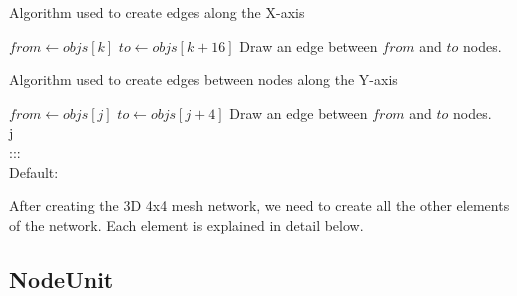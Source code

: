 \vspace{15mm}
\begin{algorithm}[H]
\small %
\caption{Algorithm used to create edges along the X-axis}
\label{alg2}
\begin{boxedminipage}{150mm}
\vspace{5mm}
\begin{algorithmic}[1]
\State $from \gets objs[k]$
\State $to \gets objs[k+16]$
\State Draw an edge between $from$ and $to$ nodes.
\EndFor
\end{algorithmic}
\vspace{5mm}
\end{boxedminipage}
\end{algorithm}
\vspace{10mm}

\begin{algorithm}[H]
\small %
\caption{Algorithm used to create edges between nodes along the Y-axis}
\label{alg3}
\begin{boxedminipage}{150mm}
\vspace{5mm}
\begin{algorithmic}[1]
\State $from \gets objs[j]$
\State $to \gets objs[j+4]$
\State Draw an edge between $from$ and $to$ nodes.
 \\
\SWITCH j \\       
 :::  
  \\
 \CASE Default: 
\EndIf
\EndFor
\end{algorithmic}
\vspace{5mm}
\end{boxedminipage}
\end{algorithm}
\vspace{10mm}



After creating the 3D 4x4 mesh network, we need to create all the other elements of the network. Each element is explained in detail below.

\subsection{NodeUnit}
\vspace{5mm}

